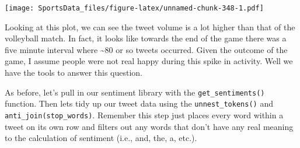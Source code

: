 \documentclass[
]{book}
\newenvironment{Shaded}{\begin{snugshade}}{\end{snugshade}}
\newcommand{\DataTypeTok}[1]{\textcolor[rgb]{0.13,0.29,0.53}{#1}}
\newcommand{\KeywordTok}[1]{\textcolor[rgb]{0.13,0.29,0.53}{\textbf{#1}}}
\newcommand{\NormalTok}[1]{#1}
\newcommand{\OperatorTok}[1]{\textcolor[rgb]{0.81,0.36,0.00}{\textbf{#1}}}
\newcommand{\StringTok}[1]{\textcolor[rgb]{0.31,0.60,0.02}{#1}}
\begin{document}
\begin{Shaded}
\end{Shaded}

\texttt{[image: SportsData\_files/figure-latex/unnamed-chunk-348-1.pdf]}

Looking at this plot, we can see the tweet volume is a lot higher than that of the volleyball match. In fact, it looks like towards the end of the game there was a five minute interval where \textasciitilde80 or so tweets occurred. Given the outcome of the game, I assume people were not real happy during this spike in activity. Well we have the tools to answer this question.

As before, let's pull in our sentiment library with the \texttt{get\_sentiments()} function. Then lets tidy up our tweet data using the \texttt{unnest\_tokens()} and \texttt{anti\_join(stop\_words)}. Remember this step just places every word within a tweet on its own row and filters out any words that don't have any real meaning to the calculation of sentiment (i.e., and, the, a, etc.).

\begin{Shaded}
\end{Shaded}
\end{document}
